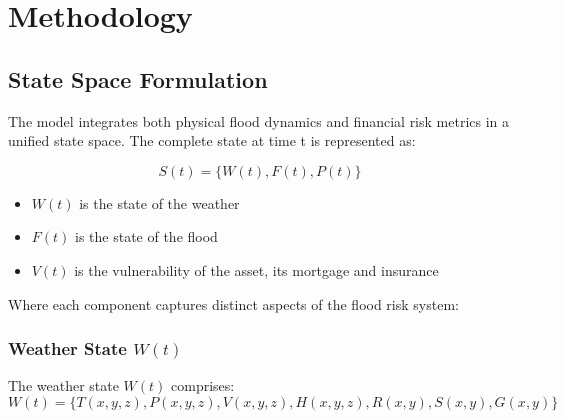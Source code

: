 \documentclass{article}
\begin{document}
\section{Methodology}

\subsection{State Space Formulation}
The model integrates both physical flood dynamics and financial risk metrics in a unified state space. The complete state at time t is represented as:

\begin{equation}
S(t) = \{W(t), F(t), P(t)\}
\end{equation}
\begin{itemize}
	\item $W(t)$ is the state of the weather
	\item $F(t)$ is the state of the flood
	\item $V(t)$ is the vulnerability of the asset,  its mortgage and insurance
\end{itemize}

Where each component captures distinct aspects of the flood risk system:

\subsubsection{Weather State $W(t)$}
The weather state $W(t)$ comprises:
\begin{equation}
W(t) = \{T(x,y,z), P(x,y,z), V(x,y,z), H(x,y,z), R(x,y), S(x,y), G(x,y)\}
\end{equation}
\end{document}
